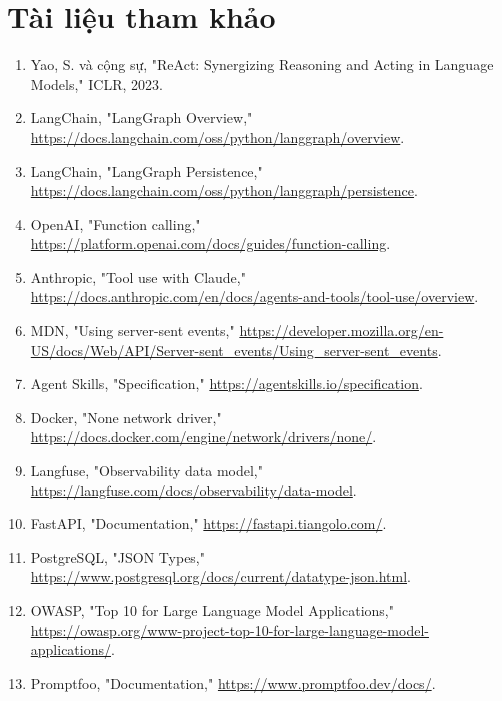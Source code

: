 \documentclass[12pt,a4paper]{article}
\begin{document}
\clearpage
\section*{Tài liệu tham khảo}
\begin{enumerate}
  \item Yao, S. và cộng sự, "ReAct: Synergizing Reasoning and Acting in Language Models," ICLR, 2023.
  \item LangChain, "LangGraph Overview," \url{https://docs.langchain.com/oss/python/langgraph/overview}.
  \item LangChain, "LangGraph Persistence," \url{https://docs.langchain.com/oss/python/langgraph/persistence}.
  \item OpenAI, "Function calling," \url{https://platform.openai.com/docs/guides/function-calling}.
  \item Anthropic, "Tool use with Claude," \url{https://docs.anthropic.com/en/docs/agents-and-tools/tool-use/overview}.
  \item MDN, "Using server-sent events," \url{https://developer.mozilla.org/en-US/docs/Web/API/Server-sent_events/Using_server-sent_events}.
  \item Agent Skills, "Specification," \url{https://agentskills.io/specification}.
  \item Docker, "None network driver," \url{https://docs.docker.com/engine/network/drivers/none/}.
  \item Langfuse, "Observability data model," \url{https://langfuse.com/docs/observability/data-model}.
  \item FastAPI, "Documentation," \url{https://fastapi.tiangolo.com/}.
  \item PostgreSQL, "JSON Types," \url{https://www.postgresql.org/docs/current/datatype-json.html}.
  \item OWASP, "Top 10 for Large Language Model Applications," \url{https://owasp.org/www-project-top-10-for-large-language-model-applications/}.
  \item Promptfoo, "Documentation," \url{https://www.promptfoo.dev/docs/}.
\end{enumerate}
\end{document}
